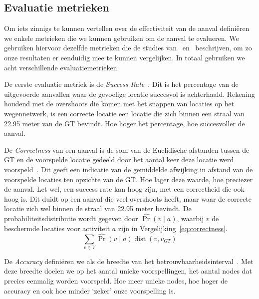\subsection{Evaluatie metrieken}
Om iets zinnigs te kunnen vertellen over de effectiviteit van de aanval
definiëren we enkele metrieken die we kunnen gebruiken om de aanval te
evalueren. We gebruiken hiervoor dezelfde metrieken die de studies
van~\citeauthor{Dhondt} en~\citeauthor{Verdonck_2022} beschrijven, om zo onze
resultaten er eenduidig mee te kunnen vergelijken. In totaal gebruiken we acht
verschillende evaluatiemetrieken.

De eerste evaluatie metriek is de \textit{Success Rate}~\cite{Dhondt}. Dit is
het percentage van de uitgevoerde aanvallen waar de gevoelige locatie succesvol
is achterhaald. Rekening houdend met de overshoots die komen met het snappen
van locaties op het wegennetwerk, is een correcte locatie een locatie die zich
binnen een straal van 22.95 meter van de \ac{GT} bevindt. Hoe hoger het
percentage, hoe succesvoller de aanval.

De \textit{Correctness} van een aanval is de som van de Euclidische afstanden
tussen de \ac{GT} en de voorspelde locatie gedeeld door het aantal keer deze
locatie werd voorspeld~\cite{Dhondt, Verdonck_2022}. Dit geeft een indicatie
van de gemiddelde afwijking in afstand van de voorspelde locaties ten opzichte
van de \ac{GT}. Hoe lager deze waarde, hoe preciezer de aanval. Let wel, een
success rate kan hoog zijn, met een correctheid die ook hoog is. Dit duidt op
een aanval die veel overshoots heeft, maar waar de correcte locatie zich wel
binnen de straal van 22.95 meter bevindt. De probabiliteitsdistributie wordt
gegeven door $\widehat{\operatorname{Pr}}(v \mid a)$, waarbij $v$ de beschermde
locaties voor activiteit $a$ zijn in Vergelijking~\ref{eq:correctness}.
\begin{equation}
    \sum_{v \in V} \widehat{\operatorname{Pr}}(v \mid a) \operatorname{dist}\left(v, v_{G T}\right)\label{eq:correctness}
\end{equation}

De \textit{Accuracy} definiëren we als de breedte van het
betrouwbaarheidsinterval~\cite{Dhondt, Verdonck_2022}. Met deze breedte doelen
we op het aantal unieke voorspellingen, het aantal nodes dat precies eenmalig
worden voorspeld. Hoe meer unieke nodes, hoe hoger de accuracy en ook hoe
minder `zeker' onze voorspelling is.


